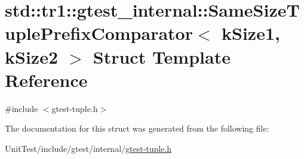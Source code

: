 \hypertarget{structstd_1_1tr1_1_1gtest__internal_1_1_same_size_tuple_prefix_comparator}{\section{std\+:\+:tr1\+:\+:gtest\+\_\+internal\+:\+:Same\+Size\+Tuple\+Prefix\+Comparator$<$ k\+Size1, k\+Size2 $>$ Struct Template Reference}
\label{structstd_1_1tr1_1_1gtest__internal_1_1_same_size_tuple_prefix_comparator}
}


{\ttfamily \#include $<$gtest-\/tuple.\+h$>$}



The documentation for this struct was generated from the following file\+:\begin{DoxyCompactItemize}
\item 
Unit\+Test/include/gtest/internal/\hyperlink{gtest-tuple_8h}{gtest-\/tuple.\+h}\end{DoxyCompactItemize}
